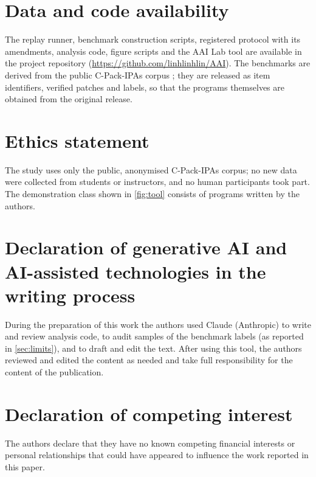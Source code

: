 \section*{Data and code availability}
The replay runner, benchmark construction scripts, registered protocol with its amendments, analysis code, figure scripts and the AAI Lab tool are available in the project repository (\url{https://github.com/linhlinhlin/AAI}). The benchmarks are derived from the public C-Pack-IPAs corpus \citep{orvalho2024cpack}; they are released as item identifiers, verified patches and labels, so that the programs themselves are obtained from the original release.

\section*{Ethics statement}
The study uses only the public, anonymised C-Pack-IPAs corpus; no new data were collected from students or instructors, and no human participants took part. The demonstration class shown in \cref{fig:tool} consists of programs written by the authors.

\section*{Declaration of generative AI and AI-assisted technologies in the writing process}
During the preparation of this work the authors used Claude (Anthropic) to write and review analysis code, to audit samples of the benchmark labels (as reported in \cref{sec:limits}), and to draft and edit the text. After using this tool, the authors reviewed and edited the content as needed and take full responsibility for the content of the publication.

\section*{Declaration of competing interest}
The authors declare that they have no known competing financial interests or personal relationships that could have appeared to influence the work reported in this paper.
